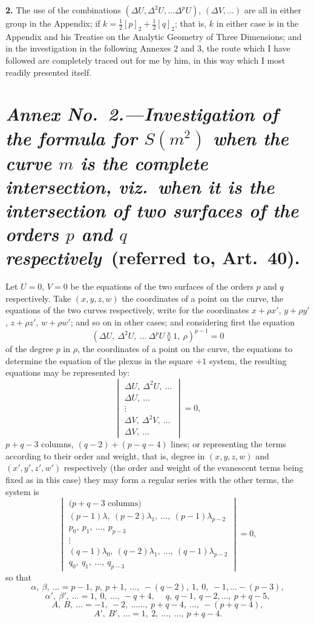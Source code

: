 \documentclass[11pt,a4paper]{article}
\begin{document}
\medskip

\noindent \textbf{2.} The use of the combinations $(\Delta U, \Delta^2 U, \ldots \Delta^p U)$, $(\Delta V, \ldots)$ are all in either group in the Appendix; if $k = \frac{1}{2}[p]_2 + \frac{1}{2}[q]_2$; that is, $k$ in either case is in the Appendix and his Treatise on the Analytic Geometry of Three Dimensions; and in the investigation in the following Annexes 2 and 3, the route which I have followed are completely traced out for me by him, in this way which I most readily presented itself.

\section*{\textit{Annex No.\ 2.---Investigation of the formula for $S(m^2)$ when the curve $m$ is the complete intersection, viz.\ when it is the intersection of two surfaces of the orders $p$ and $q$ respectively}\ (referred to, Art.\ 40).}

\noindent Let $U=0$, $V=0$ be the equations of the two surfaces of the orders $p$ and $q$ respectively. Take $(x, y, z, w)$ the coordinates of a point on the curve, the equations of the two curves respectively, write for the coordinates $x + \rho x'$, $y + \rho y'$, $z + \rho z'$, $w + \rho w'$; and so on in other cases; and considering first the equation
\[
(\Delta U,\ \Delta^2 U,\ \ldots\ \Delta^p U\!\between\!1,\ \rho)^{p-1} = 0
\]
of the degree $p$ in $\rho$, the coordinates of a point on the curve, the equations to determine the equation of the plexus in the square $+1$ system, the resulting equations may be represented by:
\[
\begin{vmatrix}
\Delta U,\ \Delta^2 U,\ \ldots \\
\Delta U,\ \ldots \\
\vdots \\
\Delta V,\ \Delta^2 V,\ \ldots \\
\Delta V,\ \ldots
\end{vmatrix} = 0,
\]
$p + q - 3$ columns, $(q-2) + (p-q-4)$ lines; or representing the terms according to their order and weight, that is, degree in $(x, y, z, w)$ and $(x', y', z', w')$ respectively (the order and weight of the evanescent terms being fixed as in this case) they may form a regular series with the other terms, the system is
\[
\begin{vmatrix}
\text{($p+q-3$ columns)} \\
\hline
(p-1)\lambda,\ (p-2)\lambda_1,\ \ldots,\ (p-1)\lambda_{p-2} \\
p_0,\ p_1,\ \ldots,\ p_{p-3} \\
\vdots \\
(q-1)\lambda_0,\ (q-2)\lambda_1,\ \ldots,\ (q-1)\lambda_{p-2} \\
q_0,\ q_1,\ \ldots,\ q_{p-3}
\end{vmatrix} = 0,
\]
so that
\[
\alpha,\ \beta,\ \ldots = p-1,\ p,\ p+1,\ \ldots,\ -(q-2),\ 1,\ 0,\ -1,\ldots-(p-3),
\]
\[
\alpha',\ \beta',\ \ldots = 1,\ 0,\ \ldots,\ -q+4,\ \quad q,\ q-1,\ q-2,\ldots,\ p+q-5,
\]
\[
A,\ B,\ \ldots = -1,\ -2,\ \ldots\ldots,\ p+q-4,\ \ldots,\ -(p+q-4),
\]
\[
A',\ B',\ \ldots = 1,\ 2,\ \ldots,\ \ldots,\ p+q-4.
\]
\end{document}
